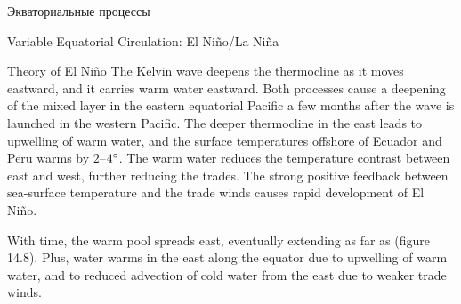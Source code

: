 \begin{chapter}{Экваториальные процессы}
\begin{section}{Variable Equatorial Circulation: El Ni\~{n}o/La Ni\~{n}a}
\begin{paragraph}{Theory of El Ni\~{n}o}
The Kelvin wave deepens the
thermocline as it moves eastward,
and it carries warm water eastward. Both processes cause a deepening
of the mixed layer in the
eastern equatorial Pacific a few months after the wave is launched in
the western Pacific. The deeper
thermocline in the east leads to
upwelling of warm water, and the surface
temperatures offshore of Ecuador and Peru warms by $2$--${4}^\circ$. The
warm water reduces the temperature contrast between east and west,
further reducing the trades. The strong positive feedback between
sea-surface temperature and the trade winds causes rapid development
of El Ni\~{n}o.
%

With time, the warm pool spreads east, eventually extending as far as
 (figure 14.8). Plus, water warms in the east along the
equator due to upwelling of warm water, and to reduced advection of
cold water from the east due to weaker trade winds.
%


\end{paragraph}
\end{section}
\end{chapter}

